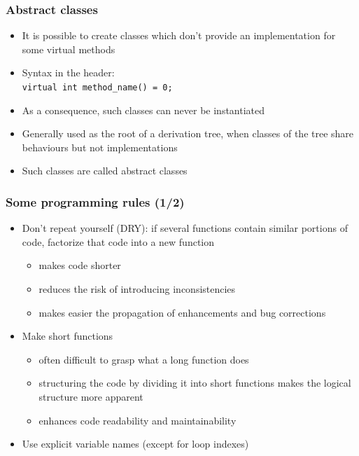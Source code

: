 \documentclass{beamer}
\begin{document}
\begin{frame}
  \frametitle{Abstract classes}
  \begin{itemize}
  \item It is possible to create classes which don't provide an implementation for some virtual methods
  \item Syntax in the header: \\
    \texttt{virtual int method\_name() = 0;}
  \item As a consequence, such classes can never be instantiated
  \item Generally used as the root of a derivation tree, when classes of the tree share behaviours but not implementations
  \item Such classes are called \alert{abstract classes}
  \end{itemize}
\end{frame}


\begin{frame}
  \frametitle{Some programming rules (1/2)}
  \begin{itemize}
  \item Don't repeat yourself (DRY): if several functions contain similar portions of code, \alert{factorize} that code into a new function
    \begin{itemize}
    \item makes code shorter
    \item reduces the risk of introducing inconsistencies
    \item makes easier the propagation of enhancements and bug corrections
    \end{itemize}
  \item Make short functions
    \begin{itemize}
    \item often difficult to grasp what a long function does
    \item structuring the code by dividing it into short functions makes the logical structure more apparent
    \item enhances code readability and maintainability
    \end{itemize}
  \item Use explicit variable names (except for loop indexes)
  \end{itemize}
\end{frame}
\end{document}
